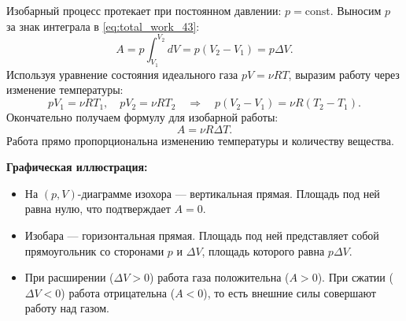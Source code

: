 \begin{theorem}
Изобарный процесс протекает при постоянном давлении: $p = \text{const}$. Выносим $p$ за знак интеграла в \eqref{eq:total_work_43}:
\begin{equation}
    A = p \int_{V_1}^{V_2} dV = p (V_2 - V_1) = p \Delta V. \label{eq:work_isobaric_V}
\end{equation}
Используя уравнение состояния идеального газа $pV = \nu RT$, выразим работу через изменение температуры:
\begin{equation}
    p V_1 = \nu R T_1, \quad p V_2 = \nu R T_2 \quad \Rightarrow \quad p(V_2 - V_1) = \nu R (T_2 - T_1).
\end{equation}
Окончательно получаем формулу для изобарной работы:
\begin{equation}
    A = \nu R \Delta T. \label{eq:work_isobaric_T}
\end{equation}
Работа прямо пропорциональна изменению температуры и количеству вещества.
\end{theorem}

\begin{remark}
\textbf{Графическая иллюстрация:}
\begin{itemize}
    \item На $(p, V)$-диаграмме изохора --- вертикальная прямая. Площадь под ней равна нулю, что подтверждает $A=0$.
    \item Изобара --- горизонтальная прямая. Площадь под ней представляет собой прямоугольник со сторонами $p$ и $\Delta V$, площадь которого равна $p \Delta V$.
    \item При расширении ($\Delta V > 0$) работа газа положительна ($A>0$). При сжатии ($\Delta V < 0$) работа отрицательна ($A<0$), то есть внешние силы совершают работу над газом.
\end{itemize}
\end{remark}

